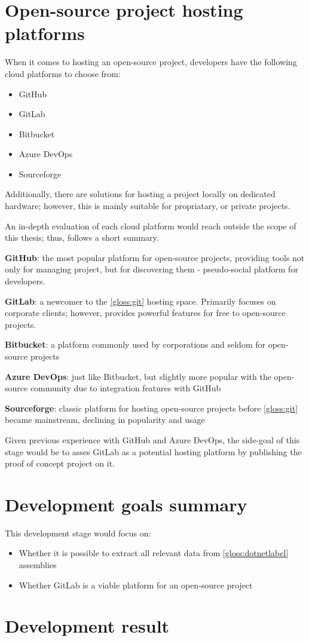 \section{Open-source project hosting platforms}
When it comes to hosting an open-source project, developers have the following cloud platforms to choose from:
\begin{itemize}
    \item GitHub
    \item GitLab
    \item Bitbucket
    \item Azure DevOps
    \item Sourceforge
\end{itemize}

Additionally, there are solutions for hosting a project locally on dedicated hardware; however, this is mainly suitable for propriatary, or private projects.

An in-depth evaluation of each cloud platform would reach outside the scope of this thesis; thus, follows a short summary.

\textbf{GitHub}: the most popular platform for open-source projects, providing tools not only for managing project, but for discovering them - pseudo-social platform for developers.

\textbf{GitLab}: a newcomer to the \ref{gloss:git} hosting space. Primarily focuses on corporate clients; however, provides powerful features for free to open-source projects.

\textbf{Bitbucket}: a platform commonly used by corporations and seldom for open-source projects

\textbf{Azure DevOps}: just like Bitbucket, but slightly more popular with the open-source community due to integration features with GitHub

\textbf{Sourceforge}: classic platform for hosting open-source projects before \ref{gloss:git} became mainstream, declining in popularity and usage

Given previous experience with GitHub and Azure DevOps, the side-goal of this stage would be to asses GitLab as a potential hosting platform by publishing the proof of concept project on it.

\section{Development goals summary}
This development stage would focus on:
\begin{itemize}
    \item Whether it is possible to extract all relevant data from \ref{gloss:dotnetlabel} assemblies
    \item Whether GitLab is a viable platform for an open-source project
\end{itemize}

\section{Development result}